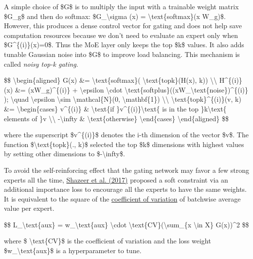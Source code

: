 A simple choice of \$G\$ is to multiply the input with a trainable weight matrix \$G\_g\$ and then do softmax: \$G\_\textbackslash sigma (x) = \textbackslash text\{softmax\}(x W\_g)\$. However, this produces a dense control vector for gating and does not help save computation resources because we don't need to evaluate an expert only when \$G\^{}\{(i)\}(x)=0\$. Thus the MoE layer only keeps the top \$k\$ values. It also adds tunable Gaussian noise into \$G\$ to improve load balancing. This mechanism is called \emph{noisy top-k gating}.

\$\$ \textbackslash begin\{aligned\} G(x) \&= \textbackslash text\{softmax\}( \textbackslash text\{topk\}(H(x), k)) \textbackslash\textbackslash{} H\^{}\{(i)\}(x) \&= (xW\_g)\^{}\{(i)\} + \textbackslash epsilon \textbackslash cdot \textbackslash text\{softplus\}((xW\_\textbackslash text\{noise\})\^{}\{(i)\} ); \textbackslash quad \textbackslash epsilon \textbackslash sim \textbackslash mathcal\{N\}(0, \textbackslash mathbf\{1\}) \textbackslash\textbackslash{} \textbackslash text\{topk\}\^{}\{(i)\}(v, k) \&= \textbackslash begin\{cases\} v\^{}\{(i)\} \& \textbackslash text\{if \}v\^{}\{(i)\}\textbackslash text\{ is in the top \}k\textbackslash text\{ elements of \}v \textbackslash\textbackslash{} -\textbackslash infty \& \textbackslash text\{otherwise\} \textbackslash end\{cases\} \textbackslash end\{aligned\} \$\$

where the superscript \$v\^{}\{(i)\}\$ denotes the i-th dimension of the vector \$v\$. The function \$\textbackslash text\{topk\}(., k)\$ selected the top \$k\$ dimensions with highest values by setting other dimensions to \$-\textbackslash infty\$.

To avoid the self-reinforcing effect that the gating network may favor a few strong experts all the time, \href{https://arxiv.org/abs/1701.06538}{Shazeer et al. (2017)} proposed a soft constraint via an additional importance loss to encourage all the experts to have the same weights. It is equivalent to the square of the \href{https://en.wikipedia.org/wiki/Coefficient_of_variation}{coefficient of variation} of batchwise average value per expert.

\$\$ L\_\textbackslash text\{aux\} = w\_\textbackslash text\{aux\} \textbackslash cdot \textbackslash text\{CV\}(\textbackslash sum\_\{x \textbackslash in X\} G(x))\^{}2 \$\$

where \$ \textbackslash text\{CV\}\$ is the coefficient of variation and the loss weight \$w\_\textbackslash text\{aux\}\$ is a hyperparameter to tune.

